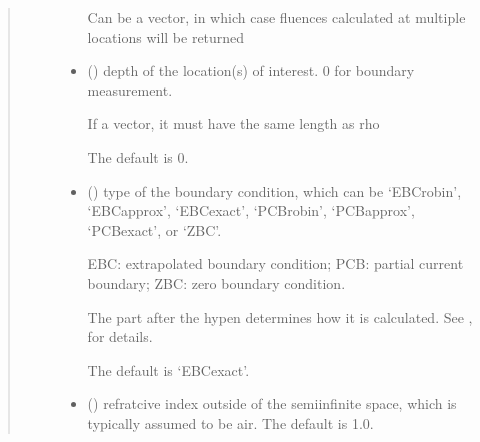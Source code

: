 \documentclass[letterpaper,10pt,english]{sphinxmanual}
\begin{document}
\begin{fulllineitems}
\begin{quote}
\begin{description}
\begin{itemize}
\sphinxAtStartPar
Can be a vector, in which case fluences calculated at multiple locations will be returned


\item {} 
\sphinxAtStartPar
{} (\sphinxstyleliteralemphasis{\sphinxupquote{, }}) \textendash{} 
\sphinxAtStartPar
depth of the location(s) of interest. 0 for boundary measurement.

\sphinxAtStartPar
If a vector, it must have the same length as rho

\sphinxAtStartPar
The default is 0.


\item {} 
\sphinxAtStartPar
{} (\sphinxstyleliteralemphasis{\sphinxupquote{, }}) \textendash{} 
\sphinxAtStartPar
type of the boundary condition, which can be ‘EBC\sphinxhyphen{}robin’, ‘EBC\sphinxhyphen{}approx’, ‘EBC\sphinxhyphen{}exact’, ‘PCB\sphinxhyphen{}robin’, ‘PCB\sphinxhyphen{}approx’, ‘PCB\sphinxhyphen{}exact’, or ‘ZBC’.

\sphinxAtStartPar
EBC: extrapolated boundary condition; PCB: partial current boundary; ZBC: zero boundary condition.

\sphinxAtStartPar
The part after the hypen determines how it is calculated.
See {\hyperref[\detokenize{_autosummary/nirfasterff.utils.boundary_attenuation:nirfasterff.utils.boundary_attenuation}]{}},  for details.

\sphinxAtStartPar
The default is ‘EBC\sphinxhyphen{}exact’.


\item {} 
\sphinxAtStartPar
{} (\sphinxstyleliteralemphasis{\sphinxupquote{, }}) \textendash{} refratcive index outside of the semi\sphinxhyphen{}infinite space, which is typically assumed to be air. The default is 1.0.

\end{itemize}


\end{description}
\end{quote}
\end{fulllineitems}
\end{document}

